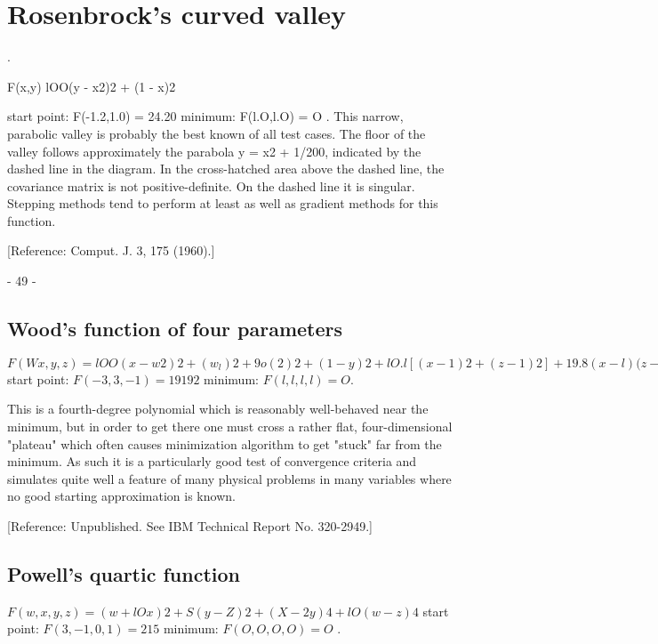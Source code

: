  
\chapter{Rosenbrock's curved valley}
  .
 
 
                  F(x,y)  lOO(y - x2)2 + (1 - x)2
 
start point:              F(-1.2,1.0) = 24.20
minimum:                  F(l.O,l.O)  = O .
     This narrow, parabolic valley is probably the best known of all test
cases.  The floor of the valley follows approximately the parabola
y = x2 + 1/200, indicated by the dashed line in the diagram.  In the
cross-hatched area above the dashed line, the covariance matrix is not
positive-definite.  On the dashed line it is singular.  Stepping methods
tend to perform at least as well as gradient methods for this function.
 
[Reference:  Comput. J. 3, 175 (1960).]
 
 
 
                                 - 49 -
 
 
\section{Wood's function of four parameters}
 
 
  $F(Wx,y,z) = lOO(x -w2)2 + (w _l)2 + 9o(    2)2
               + (1- y)2 + lO.l[(x -1)2 + (z -1)2] + 19.8(x -l)(z - 1$
start point:            $F(-3,    3,-1) = 19192$
minimum:                $F(l,l,l,l)     = O$.
 
     This is a fourth-degree polynomial which is reasonably well-behaved
near the minimum, but in order to get there one must cross a rather flat,
four-dimensional "plateau" which often causes minimization algorithm to
get "stuck" far from the minimum.  As such it is a particularly good
test of convergence criteria and simulates quite well a feature of many
physical problems in many variables where no good starting
approximation is known.
 
 
[Reference:  Unpublished.  See IBM Technical Report No. 320-2949.]
 
 
\section{Powell's quartic function}
 
 
     $F(w,x,y,z) = (w + lOx)2 + S(y- Z)2 + (X - 2y)4 + lO(w -z)4$
start point:               $F(3,-1,0,1) = 215$
minimum:                  $ F(O,O,O,O)  = O$ .
 
